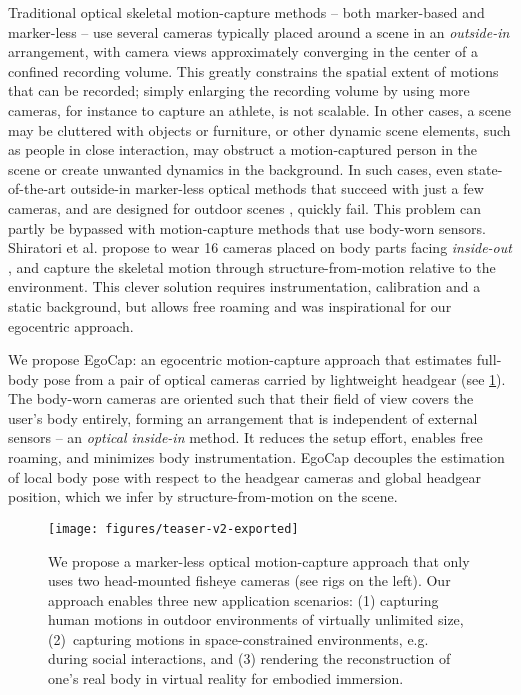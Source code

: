 \documentclass[runningheads]{llncs}
\begin{document}
Traditional optical skeletal motion-capture methods -- both marker-based and marker-less -- use several cameras typically placed around a scene in an \textit{outside-in} arrangement, with camera views approximately converging in the center of a confined recording volume.
%
This greatly constrains the spatial extent of motions that can be recorded; simply enlarging the recording volume by using more cameras, for instance to capture an athlete, is not scalable.
%
In other cases, a scene may be cluttered with objects or furniture, or other dynamic scene elements, such as people in close interaction, may obstruct a motion-captured person in the scene or create unwanted dynamics in the background.
%
In such cases, even state-of-the-art outside-in marker-less optical methods that succeed with just a few cameras, and are designed for outdoor scenes \cite{ElhayAJTPABST2015}, quickly fail.
This problem can partly be bypassed with motion-capture methods that use body-worn sensors.
Shiratori et al. propose to wear 16 cameras placed on body parts facing \textit{inside-out} \cite{ShiraPSSH2011}, and capture the skeletal motion through structure-from-motion relative to the environment.
%
This clever solution requires instrumentation, calibration and a static background, but allows free roaming and was inspirational for our egocentric approach.

We propose EgoCap: an egocentric motion-capture approach that
estimates full-body pose from a pair of optical cameras carried by
lightweight headgear (see \cref{fig:teaser}). The body-worn cameras are
oriented such that their field of view covers the user’s body entirely,
forming an arrangement that is independent of external sensors – an
 \textit{optical inside-in} method.
%
%
%
%
%
%
%
It reduces the setup effort, enables free roaming, and minimizes body instrumentation.
%
EgoCap decouples the estimation of local body pose with respect to the headgear cameras and global headgear position, which we infer by structure-from-motion on the scene. %

\begin{figure}[t]
	\texttt{[image: figures/teaser-v2-exported]}%
	\caption{
		We propose a marker-less optical motion-capture approach that only uses two head-mounted fisheye cameras (see rigs on the left).
		Our approach enables three new application scenarios:
		(1) capturing human motions in outdoor environments of virtually unlimited size,
		(2)~capturing motions in space-constrained environments, e.g. during social interactions, and
		(3) rendering the reconstruction of one's real body in virtual reality for embodied immersion.
	}
	\label{fig:teaser}
\end{figure}
\end{document}
